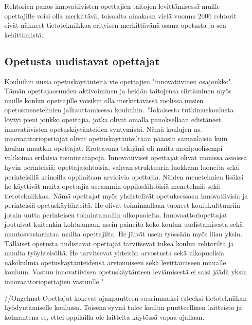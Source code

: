 \documentclass[utf8,bachelor]{gradu3}
\begin{document}
 Rehtorien panos innovatiivisten opettajien taitojen levittämisessä muille opettajille voisi olla merkittävä, toisaalta ainakaan vielä vuonna 2006 rehtorit eivät nähneet tietotekniikkaa erityisen merkittävänä osana opetusta ja sen kehittämistä. \parencite[][]{koulunArki}



\subsection{Opetusta uudistavat opettajat}
Kouluihin uusia opetuskäytänteitä vie opettajien "innovatiivinen osajoukko". Tämän opettajaosuuden aktivoiminen ja heidän taitojensa siirtäminen myös muille koulun opettajille voisikin olla merkittävässä roolissa uusien opetusmenetelmien jalkauttamisessa kouluihin.
\textit "Jokaisesta tutkimuskoulusta löytyi pieni joukko opettajia, jotka olivat omalla panoksellaan edistäneet innovatiivisten opetuskäytänteiden syntymistä. Nämä koulujen ns. innovaattoriopettajat olivat opetuskäytänteiltään pääosin samanlaisia kuin koulun muutkin opettajat. Erottavana tekijänä oli muita monipuolisempi valikoima erilaisia toimintatapoja. Innovatiiviset opettajat olivat monissa asioissa hyvin perinteisiä: opettajajohtoisia, vahvan struktuurin luokkaan luoneita sekä perinteisillä keinoilla oppilaitaan arvioivia opettajia. Näiden menetelmien lisäksi he käyttivät muita opettajia useammin oppilaslähtöisiä menetelmiä sekä tietotekniikkaa. Nämä opettajat myös yhdistelivät opetuksessaan innovatiivisia ja perinteisiä opetuskäytänteitä. He olivat toiminnallaan tuoneet koulukulttuuriin jotain uutta perinteisen toimintamallin ulkopuolelta. Innovaattoriopettajat joutuivat kuitenkin kohtaamaan usein paineita koko koulun uudistamisesta sekä muutosvastarintaa muilta opettajilta. He jäivät usein työssään myös liian yksin. Tällaiset opetusta uudistavat opettajat tarvitsevat tukea koulun rehtorilta ja muulta työyhteisöltä. He tarvitsevat yhteisön arvostusta sekä ulkopuolisia näkökulmia opetuskäytänteidensä arvioimiseen sekä levittämiseen muualle kouluun. Vastuu innovatiivisen opetuskäytänteen leviämisestä ei saisi jäädä yksin innovaattoriopettajien vastuulle." \parencite[][]{koulunArki}

//Ongelmat
Opettajat kokevat ajanpuutteen suurimmaksi esteeksi tietotekniikan hyödyntämiselle koulussa. Toisena syynä tulee koulun puutteellinen laitteisto ja kolmantena se, ettei oppilailla ole laitteita käytössä vapaa-ajallaan. \parencite[][]{sites}

\end{document}
